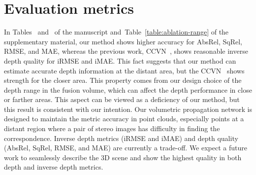 \documentclass[letterpaper, 10 pt, conference]{ieeeconf}
\newcommand{\Tref}[1]{Table~\textcolor{blue}{\ref{#1}}}
\newcommand{\RNum}[1]{\uppercase\expandafter{\romannumeral #1\relax}}
\begin{document}
\section{Evaluation metrics}
\label{supp-sec:Evaluation metrics}
In Tables~\textcolor{blue}{\RNum{1}} and~\textcolor{blue}{\RNum{2}} of the manuscript and~\Tref{table:ablation-range} of the supplementary material, our method shows higher accuracy for AbsRel, SqRel, RMSE, and MAE, whereas the previous work, CCVN~\cite{stereolidar_norm_costV_ccvn}, shows reasonable inverse depth quality for iRMSE and iMAE. This fact suggests that our method can estimate accurate depth information at the distant area, but the CCVN~\cite{stereolidar_norm_costV_ccvn} shows strength for the closer area. This property comes from our design choice of the depth range in the fusion volume, which can affect the depth performance in close or farther areas. 
This aspect can be viewed as a deficiency of our method, but this result is consistent with our intention. Our volumetric propagation network is designed to maintain the metric accuracy in point clouds, especially points at a distant region where a pair of stereo images has difficulty in finding the correspondence. Inverse depth metrics (iRMSE and iMAE) and depth quality (AbsRel, SqRel, RMSE, and MAE) are currently a trade-off. We expect a future work to seamlessly describe the 3D scene and show the highest quality in both depth and inverse depth metrics.
\end{document}
